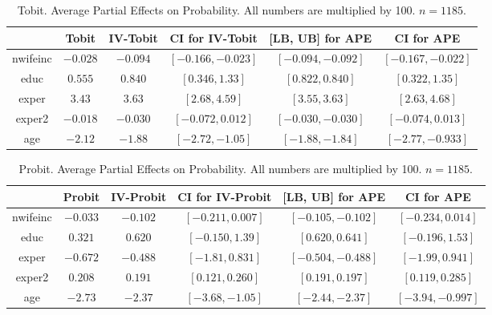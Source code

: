 \documentclass[12pt]{article}
\begin{document}
\begin{table}[!h]
  \begin{center}
  \begin{tabular}{|c|c|cc|cc|}
    \hline\hline
   &  Tobit & IV-Tobit & CI for IV-Tobit & [LB, UB] for APE & CI for APE\\ \hline
    nwifeinc &  $-0.028$ & $-0.094$ & $[-0.166,-0.023]$ & $[-0.094,-0.092]$ & $[-0.167,-0.022]$\\ 
    educ &  $0.555$ & $0.840$ & $[0.346,1.33]$ & $[0.822,0.840]$ & $[0.322,1.35]$\\ 
    exper &  $3.43$ & $3.63$ & $[2.68,4.59]$ & $[3.55,3.63]$ & $[2.63,4.68]$\\ 
    exper2 &  $-0.018$ & $-0.030$ & $[-0.072,0.012]$ & $[-0.030,-0.030]$ & $[-0.074,0.013]$\\ 
    age &  $-2.12$ & $-1.88$ & $[-2.72,-1.05]$ & $[-1.88,-1.84]$ & $[-2.77,-0.933]$\\ 
  \hline\hline
  \end{tabular}
  \caption{Tobit. Average Partial Effects on Probability. All numbers are multiplied by 100. $n=1185$.}
  \label{table:Emp-Tobit-PEM-P-w-CI}
  \end{center}
\end{table}

\begin{table}[!h]
  \begin{center}
  \begin{tabular}{|c|c|cc|cc|}
    \hline\hline
   &  Probit & IV-Probit & CI for IV-Probit & [LB, UB] for APE & CI for APE\\ \hline
    nwifeinc &  $-0.033$ & $-0.102$ & $[-0.211,0.007]$ & $[-0.105,-0.102]$ & $[-0.234,0.014]$\\ 
    educ &  $0.321$ & $0.620$ & $[-0.150,1.39]$ & $[0.620,0.641]$ & $[-0.196,1.53]$\\ 
    exper &  $-0.672$ & $-0.488$ & $[-1.81,0.831]$ & $[-0.504,-0.488]$ & $[-1.99,0.941]$\\ 
    exper2 &  $0.208$ & $0.191$ & $[0.121,0.260]$ & $[0.191,0.197]$ & $[0.119,0.285]$\\ 
    age &  $-2.73$ & $-2.37$ & $[-3.68,-1.05]$ & $[-2.44,-2.37]$ & $[-3.94,-0.997]$\\ 
  \hline\hline
  \end{tabular}
  \caption{Probit. Average Partial Effects on Probability. All numbers are multiplied by 100. $n=1185$.}
  \label{table:Emp-Probit-PEM-P-w-CI}
  \end{center}
\end{table}
\end{document}
